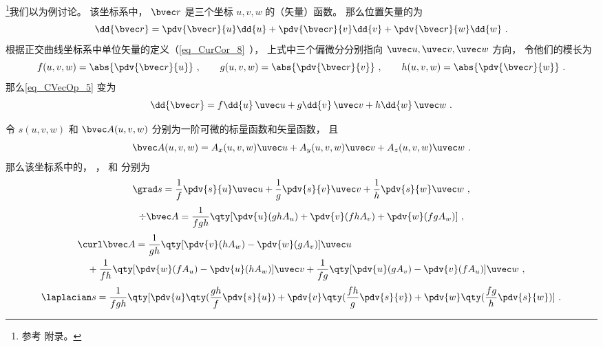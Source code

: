 

\footnote{参考 \cite{GriffE} 附录。}我们以为例讨论。 该坐标系中， $\bvec r$ 是三个坐标 $u, v, w$ 的（矢量）函数。 那么位置矢量的为
\begin{equation}\label{eq_CVecOp_5}
\dd{\bvec r} = \pdv{\bvec r}{u}\dd{u} + \pdv{\bvec r}{v}\dd{v} + \pdv{\bvec r}{w}\dd{w}~.
\end{equation}
根据正交曲线坐标系中单位矢量的定义（\autoref{eq_CurCor_8}~）， 上式中三个偏微分分别指向 $\uvec u, \uvec v, \uvec w$ 方向， 令他们的模长为
\begin{equation}
f(u,v,w) = \abs{\pdv{\bvec r}{u}}~, \qquad
g(u,v,w) = \abs{\pdv{\bvec r}{v}} ~,\qquad
h(u,v,w) = \abs{\pdv{\bvec r}{w}}~.
\end{equation}
那么\autoref{eq_CVecOp_5} 变为
\begin{equation}\label{eq_CVecOp_4}
\dd{\bvec r} = f\dd{u}\,\uvec u + g\dd{v}\,\uvec v + h\dd{w}\,\uvec w~.
\end{equation}


令 $s(u, v, w)$ 和 $\bvec A(u, v, w)$ 分别为一阶可微的标量函数和矢量函数， 且
\begin{equation}\label{eq_CVecOp_7}
\bvec A(u, v, w) = A_x(u, v, w)\uvec u + A_y(u, v, w)\uvec v + A_z(u, v, w)\uvec w~.
\end{equation}
那么该坐标系中的， ， 和 分别为
\begin{equation}\label{eq_CVecOp_1}
\grad s = \frac{1}{f} \pdv{s}{u}\uvec u + \frac{1}{g}\pdv{s}{v} \uvec v + \frac{1}{h} \pdv{s}{w}\uvec w~,
\end{equation}
\begin{equation}\label{eq_CVecOp_2}
\div \bvec A = \frac{1}{fgh}\qty[\pdv{u}(ghA_u) + \pdv{v}(fhA_v) + \pdv{w}(fgA_w)]~,
\end{equation}
\begin{equation}\label{eq_CVecOp_3}
\begin{aligned}
&\curl \bvec A = \frac{1}{gh}\qty[\pdv{v}(hA_w) - \pdv{w}(gA_v)]\uvec u\\
&\quad + \frac{1}{fh}\qty[\pdv{w}(fA_u) - \pdv{u}(hA_w)]\uvec v
+ \frac{1}{fg}\qty[\pdv{u}(gA_v) - \pdv{v}(fA_u)]\uvec w~,
\end{aligned}
\end{equation}
\begin{equation}\label{eq_CVecOp_6}
\laplacian s = \frac{1}{fgh}\qty[\pdv{u}\qty(\frac{gh}{f}\pdv{s}{u}) + \pdv{v}\qty(\frac{fh}{g}\pdv{s}{v}) + \pdv{w}\qty(\frac{fg}{h}\pdv{s}{w})]~.
\end{equation}

